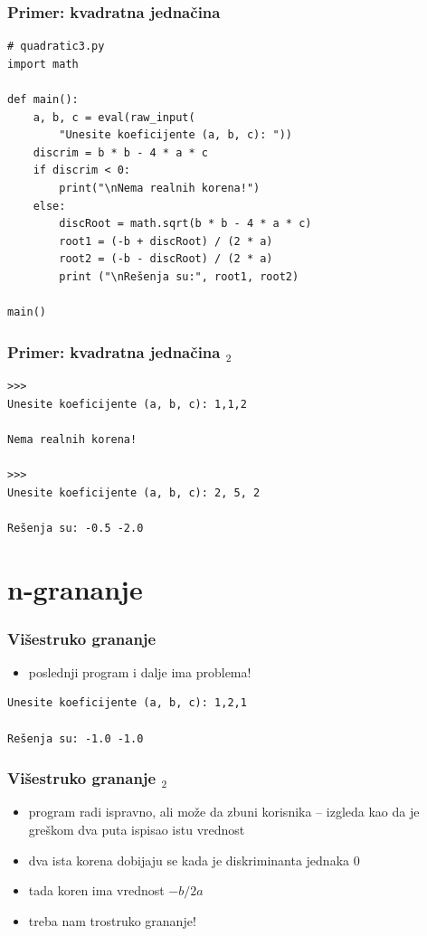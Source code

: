 \documentclass[utf8,compress]{beamer}
\begin{document}
\begin{frame}[fragile,shrink=5]
  \frametitle{Primer: kvadratna jednačina}
\begin{verbatim}
# quadratic3.py
import math 

def main():
    a, b, c = eval(raw_input(
        "Unesite koeficijente (a, b, c): "))
    discrim = b * b - 4 * a * c
    if discrim < 0:
        print("\nNema realnih korena!")
    else:
        discRoot = math.sqrt(b * b - 4 * a * c)
        root1 = (-b + discRoot) / (2 * a)
        root2 = (-b - discRoot) / (2 * a)
        print ("\nRešenja su:", root1, root2)

main()
\end{verbatim}
\end{frame}

\begin{frame}[fragile]
  \frametitle{Primer: kvadratna jednačina $_2$}
\begin{verbatim}
>>> 
Unesite koeficijente (a, b, c): 1,1,2

Nema realnih korena!

>>> 
Unesite koeficijente (a, b, c): 2, 5, 2

Rešenja su: -0.5 -2.0
\end{verbatim}
\end{frame}

\section{n-grananje}

\begin{frame}[fragile]
  \frametitle{Višestruko grananje}
  \begin{itemize}
    \item poslednji program i dalje ima problema!
  \end{itemize}
\begin{verbatim}
Unesite koeficijente (a, b, c): 1,2,1

Rešenja su: -1.0 -1.0
\end{verbatim}
\end{frame}

\begin{frame}[fragile]
  \frametitle{Višestruko grananje $_2$}
  \begin{itemize}
    \item program radi ispravno, ali može da zbuni korisnika -- izgleda kao da je greškom dva puta ispisao istu vrednost
    \item dva ista korena dobijaju se kada je diskriminanta jednaka 0
    \item tada koren ima vrednost $-b/2a$
    \item treba nam trostruko grananje!
  \end{itemize}
\end{frame}
\end{document}
